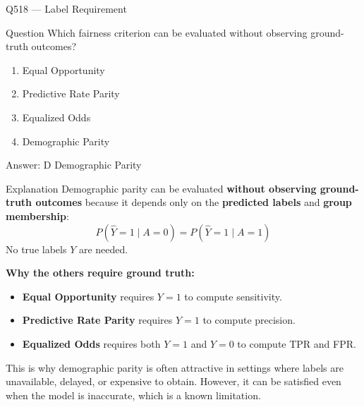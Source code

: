 \documentclass[aspectratio=169,8pt]{beamer}
\begin{document}
\begin{frame}{Q518 --- Label Requirement}
	\begin{block}{Question}
		Which fairness criterion can be evaluated without observing ground-truth outcomes?
		\begin{enumerate}
			\item Equal Opportunity
			\item Predictive Rate Parity
			\item Equalized Odds
			\item Demographic Parity
		\end{enumerate}
	\end{block}
	\begin{exampleblock}{Answer: D}
		Demographic Parity
	\end{exampleblock}
	\begin{block}{Explanation}
		Demographic parity can be evaluated \textbf{without observing ground-truth
			outcomes} because it depends only on the \textbf{predicted labels} and
		\textbf{group membership}:
		\[
		P(\hat{Y} = 1 \mid A = 0) = P(\hat{Y} = 1 \mid A = 1)
		\]
		No true labels \(Y\) are needed.
		
		\textbf{Why the others require ground truth:}
		\begin{itemize}
			\item \textbf{Equal Opportunity} requires \(Y = 1\) to compute sensitivity.
			\item \textbf{Predictive Rate Parity} requires \(Y = 1\) to compute precision.
			\item \textbf{Equalized Odds} requires both \(Y = 1\) and \(Y = 0\) to
			compute TPR and FPR.
		\end{itemize}
		This is why demographic parity is often attractive in settings where
		labels are unavailable, delayed, or expensive to obtain. However, it can
		be satisfied even when the model is inaccurate, which is a known limitation.
	\end{block}
\end{frame}
\end{document}
